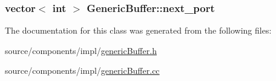 \hypertarget{classGenericBuffer_10b8e8d2522ed4797fa485d6ffa41838}{
\subsubsection[{next\_\-port}]{\setlength{\rightskip}{0pt plus 5cm}vector$<$ int $>$ {\bf GenericBuffer::next\_\-port}}}
\label{classGenericBuffer_10b8e8d2522ed4797fa485d6ffa41838}




The documentation for this class was generated from the following files:\begin{CompactItemize}
\item 
source/components/impl/\hyperlink{impl_2genericBuffer_8h}{genericBuffer.h}\item 
source/components/impl/\hyperlink{impl_2genericBuffer_8cc}{genericBuffer.cc}\end{CompactItemize}
